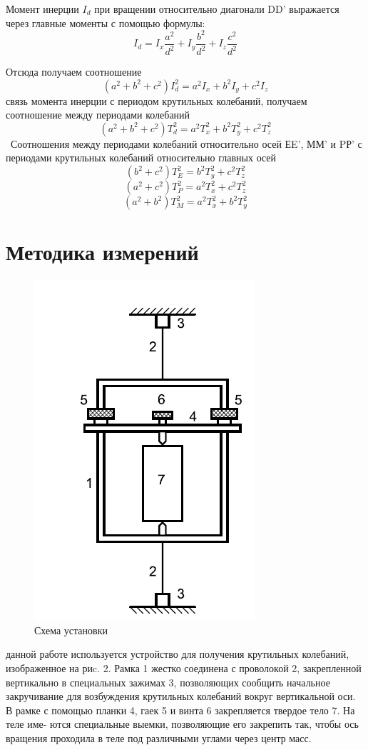 \documentclass[a4paper, 10pt]{article}%
\begin{document}
Момент инерции $I_{d}$ при вращении относительно диагонали DD' выражается
 через главные моменты с помощью формулы:
\begin{equation}
    I_{d}=I_{x}\frac{a^2}{d^2}+I_{y}\frac{b^2}{d^2}+I_{z}\frac{c^2}{d^2}
\end{equation}

Отсюда получаем соотношение
\begin{equation}
    (a^2+b^2+c^2)I^2_{d}=a^2 I_{x}+b^2 I_{y}+ c^2 I_{z}
\end{equation}
\quad{} связь момента инерции с периодом крутильных колебаний, получаем соотношение между периодами колебаний
\begin{equation}
    (a^2+b^2+c^2)T^2_{d}=a^2 T^2_{x}+b^2 T^2_{y}+c^2 T^2_{z}
\end{equation}
\quad\quad\ Соотношения между периодами колебаний относительно осей ЕE',
ММ' и PР' с периодами крутильных колебаний относительно главных осей
$$(b^2+c^2)T^2_{E}=b^2 T^2_{y}+c^2 T^2_{z}$$
$$(a^2+c^2)T^2_{P}=a^2 T^2_{x}+c^2 T^2_{z}$$
$$(a^2+b^2)T^2_{M}=a^2 T^2_{x}+b^2 T^2_{y}$$


\section{Методика измерений}

\begin{figure}[h]
                \centering
                \includegraphics[width=0.3\linewidth]{ystanovka.png}
                \caption{Схема установки}
                \label{fig:mpr}
\end{figure}

\quad{} данной работе используется устройство для получения крутильных колебаний, изображенное на риc. 2. Рамка 1 жестко соединена
с проволокой 2, закрепленной вертикально в специальных зажимах
3, позволяющих сообщить начальное закручивание для возбуждения
крутильных колебаний вокруг вертикальной оси. В рамке с помощью
планки 4, гаек 5 и винта 6 закрепляется твердое тело 7. На теле име-
ются специальные выемки, позволяющие его закрепить так, чтобы ось
вращения проходила в теле под различными углами через центр масс.
\end{document}
